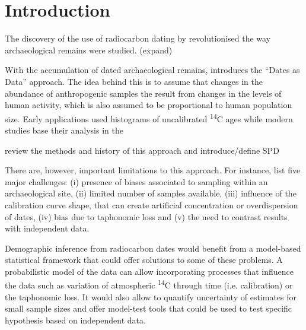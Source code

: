 \documentclass[a4paper]{article}
\begin{document}
\beginingpreprint

\linenumbers



\section*{\centering Introduction}

The discovery of the use of radiocarbon dating by \textcite{Libby1949} revolutionised the way archaeological remains were studied. (expand)

With the accumulation of dated archaeological remains, \textcite{Rick1987} introduces the ``Dates as Data'' approach. The idea behind this is to assume that changes in the abundance of anthropogenic samples the result from changes in the levels of human activity, which is also assumed to be proportional to human population size. Early applications used histograms of uncalibrated \textsuperscript{14}C ages while modern studies base their analysis in the 





review the methods and history of this approach and introduce/define SPD


There are, however, important limitations to this approach. For instance, \textcite{Williams2012} list five major challenges: (i) presence of biases associated to sampling within an archaeological site, (ii) limited number of samples available, (iii) influence of the calibration curve shape, that can create artificial concentration or overdispersion of dates, (iv) bias due to taphonomic loss and (v) the need to contrast results with independent data. 

Demographic inference from radiocarbon dates would benefit from a model-based statistical framework that could offer solutions to some of these problems. A probabilistic model of the data can allow incorporating processes that influence the data such as variation of atmospheric \textsuperscript{14}C through time (i.e. calibration) or the taphonomic loss. It would also allow to quantify uncertainty of estimates for small sample sizes and offer model-test tools that could be used to test specific hypothesis based on independent data.  
\end{document}
